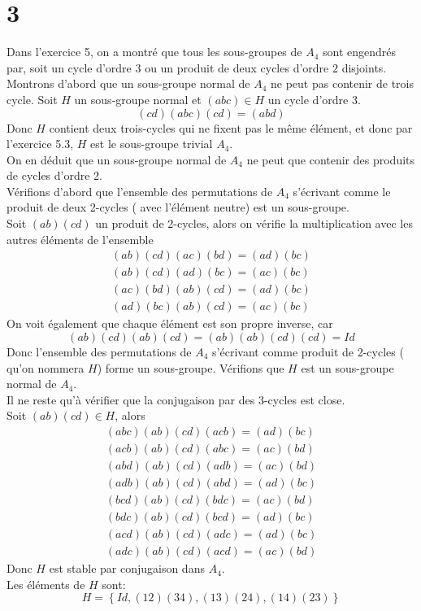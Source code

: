\documentclass[11pt, a4paper, twoside]{article}
\begin{document}
\section*{3}
Dans l'exercice 5, on a montré que tous les sous-groupes de $A_4$ sont engendrés par, soit un cycle d'ordre 3 ou un produit de deux cycles d'ordre 2 disjoints.\\
Montrons d'abord que un sous-groupe normal de $A_4$ ne peut pas contenir de trois cycle.
Soit $H$ un sous-groupe normal et $( abc)\in H $ un cycle d'ordre 3.
\[ 
	( cd)(abc ) ( cd) = ( abd) 
\]
Donc $H$ contient deux trois-cycles qui ne fixent pas le même élément, et donc par l'exercice 5.3, $H$ est le sous-groupe trivial $A_4$.\\
On en déduit que un sous-groupe normal de $A_4$ ne peut que contenir des produits de cycles d'ordre 2.\\
Vérifions d'abord que l'ensemble des permutations de $A_4$ s'écrivant comme le produit de deux 2-cycles ( avec l'élément neutre)  est un sous-groupe.\\
Soit $( ab) ( cd) $ un produit de 2-cycles, alors on vérifie la multiplication avec les autres éléments de l'ensemble
\begin{align*}
	( ab) ( cd) ( ac) ( bd) = ( ad) ( bc) \\
	( ab) ( cd) ( ad) ( bc) = ( ac) ( bc) \\
	( ac) ( bd) ( ab) ( cd)= ( ad) ( bc) \\
	 ( ad) ( bc) ( ab) ( cd)= ( ac) ( bc)
\end{align*}
On voit également que chaque élément est son propre inverse, car
\[ 
	( ab) ( cd) ( ab) ( cd) = ( ab) ( ab) ( cd) ( cd) = Id
\]
Donc l'ensemble des permutations de $A_4$ s'écrivant comme produit de 2-cycles ( qu'on nommera $H$) forme un sous-groupe.
Vérifions que $H$ est un sous-groupe normal de $A_4$.\\
Il ne reste qu'à vérifier que la conjugaison par des 3-cycles est close.\\
Soit $( ab) ( cd) \in H$, alors
\begin{align*}
	( abc) ( ab) ( cd) ( acb) = ( ad) ( bc)\\
	( acb) ( ab) ( cd) ( abc) = ( ac) ( bd)\\
	( abd) ( ab) ( cd) ( adb) = ( ac) ( bd)\\
	( adb) ( ab) ( cd) ( abd) = ( ad) ( bc)\\
	( bcd) ( ab) ( cd) ( bdc) = ( ac) ( bd)\\
	( bdc) ( ab) ( cd) ( bcd) = ( ad) ( bc)\\
	( acd) ( ab) ( cd) ( adc) = ( ad) ( bc)\\
	( adc) ( ab) ( cd) ( acd) = ( ac) ( bd) 
\end{align*}
Donc $H$ est stable par conjugaison dans $A_4$.\\
Les éléments de $H$ sont:
\[ 
	H = \left\{ Id, ( 12)( 34) , ( 13) ( 24), ( 14)( 23)  \right\} 
\]
\end{document}
